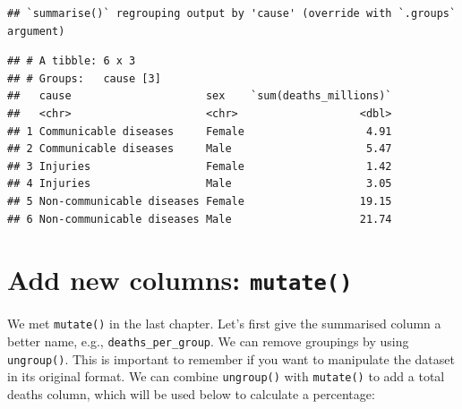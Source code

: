 \documentclass[
  12pt,
  krantz2]{krantz}
\makeatletter
\newenvironment{Shaded}{\begin{snugshade}}{\end{snugshade}}
\newcommand{\DataTypeTok}[1]{\textcolor[rgb]{0.13,0.29,0.53}{#1}}
\newcommand{\KeywordTok}[1]{\textcolor[rgb]{0.13,0.29,0.53}{\textbf{#1}}}
\newcommand{\NormalTok}[1]{#1}
\newcommand{\OperatorTok}[1]{\textcolor[rgb]{0.81,0.36,0.00}{\textbf{#1}}}
\newcommand{\StringTok}[1]{\textcolor[rgb]{0.31,0.60,0.02}{#1}}
\newenvironment{kframe}{%
\medskip{}
\setlength{\fboxsep}{.8em}
 \def\at@end@of@kframe{}%
 \ifinner\ifhmode%
  \def\at@end@of@kframe{\end{minipage}}%
  \begin{minipage}{\columnwidth}%
 \fi\fi%
 \def\FrameCommand##1{\hskip\@totalleftmargin \hskip-\fboxsep
 \colorbox{shadecolor}{##1}\hskip-\fboxsep
     \hskip-\linewidth \hskip-\@totalleftmargin \hskip\columnwidth}%
 \MakeFramed {\advance\hsize-\width
   \@totalleftmargin\z@ \linewidth\hsize
   \@setminipage}}%
 {\par\unskip\endMakeFramed%
 \at@end@of@kframe}
\renewenvironment{Shaded}{\begin{kframe}}{\end{kframe}}
\makeatother
\begin{document}
\begin{verbatim}
## `summarise()` regrouping output by 'cause' (override with `.groups` argument)
\end{verbatim}

\begin{verbatim}
## # A tibble: 6 x 3
## # Groups:   cause [3]
##   cause                     sex    `sum(deaths_millions)`
##   <chr>                     <chr>                   <dbl>
## 1 Communicable diseases     Female                   4.91
## 2 Communicable diseases     Male                     5.47
## 3 Injuries                  Female                   1.42
## 4 Injuries                  Male                     3.05
## 5 Non-communicable diseases Female                  19.15
## 6 Non-communicable diseases Male                    21.74
\end{verbatim}

\hypertarget{add-new-columns-mutate}{%
\section{\texorpdfstring{Add new columns: \texttt{mutate()}}{Add new columns: mutate()}}\label{add-new-columns-mutate}}


We met \texttt{mutate()} in the last chapter.
Let's first give the summarised column a better name, e.g., \texttt{deaths\_per\_group}.
We can remove groupings by using \texttt{ungroup()}.
This is important to remember if you want to manipulate the dataset in its original format.
We can combine \texttt{ungroup()} with \texttt{mutate()} to add a total deaths column, which will be used below to calculate a percentage:

\begin{Shaded}
\end{Shaded}
\end{document}
